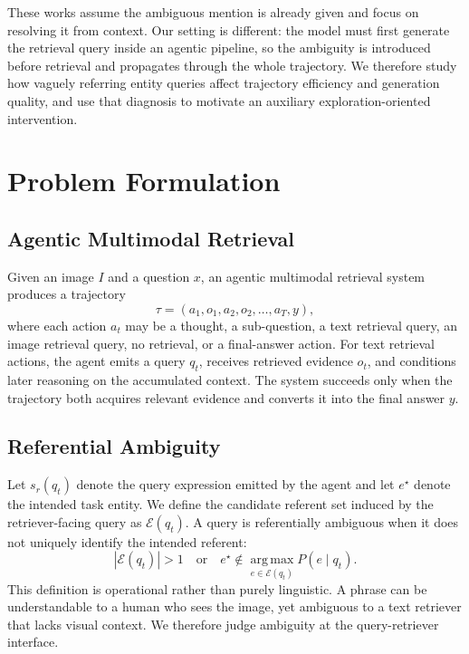 \documentclass{article} %
\newcommand{\query}{q}
\newcommand{\entity}{e}
\begin{document}
These works assume the ambiguous mention is already given and focus on resolving it from context. Our setting is different: the model must first generate the retrieval query inside an agentic pipeline, so the ambiguity is introduced before retrieval and propagates through the whole trajectory. We therefore study how vaguely referring entity queries affect trajectory efficiency and generation quality, and use that diagnosis to motivate an auxiliary exploration-oriented intervention.
\section{Problem Formulation}
\subsection{Agentic Multimodal Retrieval}
Given an image $I$ and a question $x$, an agentic multimodal retrieval system produces a trajectory
\begin{equation}
    \tau = (a_1, o_1, a_2, o_2, \ldots, a_T, y),
\end{equation}
where each action $a_t$ may be a thought, a sub-question, a text retrieval query, an image retrieval query, no retrieval, or a final-answer action.
For text retrieval actions, the agent emits a query $\query_t$, receives retrieved evidence $o_t$, and conditions later reasoning on the accumulated context.
The system succeeds only when the trajectory both acquires relevant evidence and converts it into the final answer $y$.

\subsection{Referential Ambiguity}
Let $s_r(\query_t)$ denote the query expression emitted by the agent and let $\entity^\star$ denote the intended task entity.
We define the candidate referent set induced by the retriever-facing query as $\mathcal{E}(\query_t)$.
A query is referentially ambiguous when it does not uniquely identify the intended referent:
\begin{equation}
    |\mathcal{E}(\query_t)| > 1
    \quad \text{or} \quad
    \entity^\star \notin \operatorname*{arg\,max}_{\entity \in \mathcal{E}(\query_t)} P(\entity \mid \query_t).
\end{equation}
This definition is operational rather than purely linguistic.
A phrase can be understandable to a human who sees the image, yet ambiguous to a text retriever that lacks visual context.
We therefore judge ambiguity at the query-retriever interface.
\end{document}
